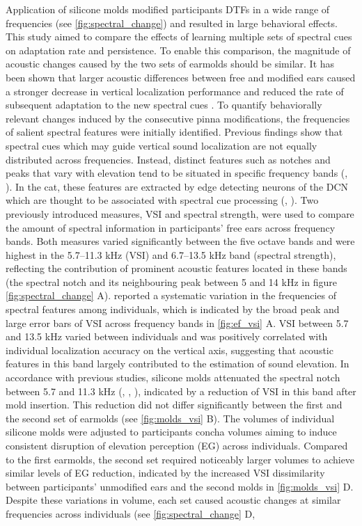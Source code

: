 Application of silicone molds modified participants DTFs in a wide range of frequencies (see \cref{fig:spectral_change}) and resulted in large behavioral effects. This study aimed to compare the effects of learning multiple sets of spectral cues on adaptation rate and persistence. To enable this comparison, the magnitude of acoustic changes caused by the two sets of earmolds should be similar. It has been shown that larger acoustic differences between free and modified ears caused a stronger decrease in vertical localization performance \citep{wanrooij_relearning_2005} and reduced the rate of subsequent adaptation to the new spectral cues \citep{trapeau_fast_2016}. To quantify behaviorally relevant changes induced by the consecutive pinna modifications, the frequencies of salient spectral features were initially identified. Previous findings show that spectral cues which may guide vertical sound localization are not equally distributed across frequencies. Instead, distinct features such as notches and peaks that vary with elevation tend to be situated in specific frequency bands (\citet{langendijk_contribution_2002}, \citet{trapeau_fast_2016}). In the cat, these features are extracted by edge detecting neurons of the DCN which are thought to be associated with spectral cue processing (\citet{davis_auditory_2003}, \citet{reiss_spectral_2005}). Two previously introduced measures, VSI and spectral strength, were used to compare the amount of spectral information in participants' free ears across frequency bands. Both measures varied significantly between the five octave bands and were highest in the 5.7–11.3 kHz (VSI) and 6.7–13.5 kHz band (spectral strength), reflecting the contribution of prominent acoustic features located in these bands (the spectral notch and its neighbouring peak between 5 and 14 kHz in figure \cref{fig:spectral_change} A). \citet{middlebrooks_individual_1999} reported a systematic variation in the frequencies of spectral features among individuals, which is indicated by the broad peak and large error bars of VSI across frequency bands in \cref{fig:ef_vsi} A. VSI between 5.7 and 13.5 kHz varied between individuals and was positively correlated with individual localization accuracy on the vertical axis, suggesting that acoustic features in this band largely contributed to the estimation of sound elevation. In accordance with previous studies, silicone molds attenuated the spectral notch between 5.7 and 11.3 kHz (\citet{hofman_relearning_1998}, \citet{wanrooij_relearning_2005}, \citet{trapeau_fast_2016}), indicated by a reduction of VSI in this band after mold insertion. This reduction did not differ significantly between the first and the second set of earmolds (see \cref{fig:molds_vsi} B). The volumes of individual silicone molds were adjusted to participants concha volumes aiming to induce consistent disruption of elevation perception (EG) across individuals. Compared to the first earmolds, the second set required noticeably larger volumes to achieve similar levels of EG reduction, indicated by the increased VSI dissimilarity between participants' unmodified ears and the second molds in \cref{fig:molds_vsi} D. Despite these variations in volume, each set caused acoustic changes at similar frequencies across individuals (see \cref{fig:spectral_change} D, 